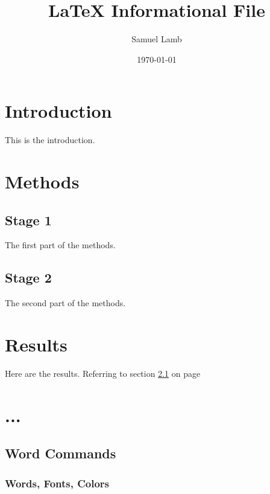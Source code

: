 \documentclass[a4paper,12pt]{report}
\begin{document}
\title{LaTeX Informational File}
\author{Samuel Lamb}
\date{\today}
\maketitle





\tableofcontents
\newpage
{}

\section{Introduction}
This is the introduction.

\section{Methods}

\subsection{Stage 1}
\label{sec1}
The first part of the methods.

\subsection{Stage 2}
The second part of the methods.

\section{Results}
Here are the results.
Referring to section \ref{sec1} on page \pageref{sec1}

\section{...}
\subsection{Word Commands}
\subsubsection{Words, Fonts, Colors}
\end{document}
